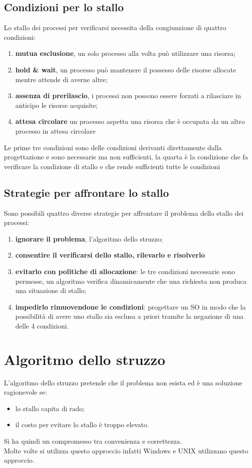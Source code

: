 \documentclass[12pt, letterpaper]{report}
\begin{document}
	\subsection{Condizioni per lo stallo}
	Lo stallo dei processi per verificarsi necessita della congiunzione di quattro condizioni:
	\begin{enumerate}
		\item \textbf{mutua esclusione}, un solo processo alla volta può utilizzare una risorsa;
		\item \textbf{hold \& wait}, un processo può mantenere il possesso delle risorse allocate mentre attende di averne altre;
		\item \textbf{assenza di prerilascio}, i processi non possono essere forzati a rilasciare in anticipo le risorse acquisite;
		\item \textbf{\color{red}attesa circolare} un processo aspetta una risorsa che è occupata da un altro processo in attesa circolare
	\end{enumerate}
	Le prime tre condizioni sono delle condizioni derivanti direttamente dalla progettazione e sono necessarie ma non sufficienti, la quarta è la condizione che fa verificare la condizione di stallo e che rende sufficienti tutte le condizioni
	\subsection{Strategie per affrontare lo stallo}
	Sono possibili quattro diverse strategie per affrontare il problema dello stallo dei processi:
	\begin{enumerate}
		\item \textbf{ignorare il problema}, l'algoritmo dello struzzo;
		\item \textbf{consentire il verificarsi dello stallo, rilevarlo e risolverlo}
		\item \textbf{evitarlo con politiche di allocazione}: le tre condizioni necessarie sono permesse, un algoritmo verifica dinamicamente che una richiesta non produca una situazione di stallo;
		\item \textbf{impedirlo rimuovendone le condizioni}: progettare un SO in modo che la possibilità di avere uno stallo sia esclusa a priori tramite la negazione di una delle 4 condizioni.
	\end{enumerate}
	\section{Algoritmo dello struzzo}
	L'algoritmo dello struzzo pretende che il problema non esista ed è una soluzione ragionevole se:
	\begin{itemize}
		\item lo stallo capita di rado;
		\item il costo per evitare lo stallo è troppo elevato.
	\end{itemize}
	Si ha quindi un compromesso tra convenienza e correttezza. \\
	Molte volte si utilizza questo approccio infatti Windows e UNIX utilizzano questo approccio.
\end{document}
